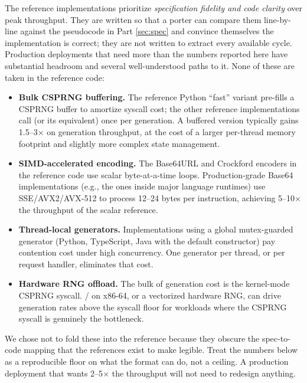 \begin{calloutwarning}
The reference implementations prioritize \emph{specification fidelity and code clarity} over peak throughput. They are written so that a porter can compare them line-by-line against the pseudocode in Part \ref{sec:spec} and convince themselves the implementation is correct; they are not written to extract every available cycle. Production deployments that need more than the numbers reported here have substantial headroom and several well-understood paths to it. None of these are taken in the reference code:
\begin{itemize}
  \item \textbf{Bulk CSPRNG buffering.} The reference Python ``fast'' variant pre-fills a CSPRNG buffer to amortize syscall cost; the other reference implementations call  (or its equivalent) once per generation. A buffered version typically gains 1.5--3$\times$ on generation throughput, at the cost of a larger per-thread memory footprint and slightly more complex state management.
  \item \textbf{SIMD-accelerated encoding.} The Base64URL and Crockford encoders in the reference code use scalar byte-at-a-time loops. Production-grade Base64 implementations (e.g., the ones inside major language runtimes) use SSE/AVX2/AVX-512 to process 12--24 bytes per instruction, achieving 5--10$\times$ the throughput of the scalar reference.
  \item \textbf{Thread-local generators.} Implementations using a global mutex-guarded generator (Python, TypeScript, Java with the default constructor) pay contention cost under high concurrency. One generator per thread, or per request handler, eliminates that cost.
  \item \textbf{Hardware RNG offload.} The bulk of generation cost is the kernel-mode CSPRNG syscall. / on x86-64, or a vectorized hardware RNG, can drive generation rates above the syscall floor for workloads where the CSPRNG syscall is genuinely the bottleneck.
\end{itemize}
We chose not to fold these into the reference because they obscure the spec-to-code mapping that the references exist to make legible. Treat the numbers below as a reproducible floor on what the format can do, not a ceiling. A production deployment that wants 2--5$\times$ the throughput will not need to redesign anything.
\end{calloutwarning}

